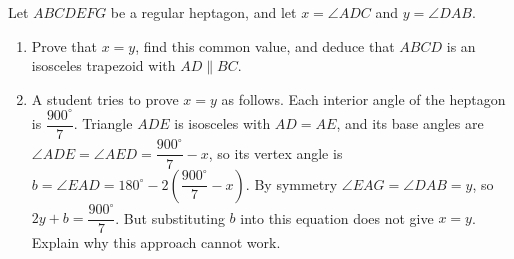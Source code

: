 Let $ABCDEFG$ be a regular heptagon, and let $x=\angle ADC$ and $y=\angle DAB$.
\begin{enumerate}
\item[(a)] Prove that $x=y$, find this common value, and deduce that $ABCD$ is an isosceles trapezoid with $AD\parallel BC$.
\item[(b)] A student tries to prove $x=y$ as follows. Each interior angle of the heptagon is $\dfrac{900^\circ}{7}$. Triangle $ADE$ is isosceles with $AD=AE$, and its base angles are $\angle ADE=\angle AED=\dfrac{900^\circ}{7}-x$, so its vertex angle is $b=\angle EAD=180^\circ-2\left(\dfrac{900^\circ}{7}-x\right)$. By symmetry $\angle EAG=\angle DAB=y$, so $2y+b=\dfrac{900^\circ}{7}$. But substituting $b$ into this equation does not give $x=y$. Explain why this approach cannot work.
\end{enumerate}
